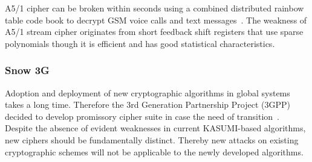 A5/1 cipher can be broken within seconds using a combined distributed
rainbow table code book to decrypt GSM voice calls and text
messages~\cite{secproject}. 
The weakness of A5/1 stream
cipher originates from short feedback shift registers that use sparse
polynomials though it is efficient and has good statistical characteristics.

\subsubsection{Snow 3G}

Adoption and deployment of new cryptographic algorithms in global systems takes
a long time. Therefore the 3rd Generation Partnership Project (3GPP) decided to
develop promissory cipher suite in case the need of
transition~\cite{3gpp:uea2_doc1}. Despite the absence of evident weaknesses in
current KASUMI-based algorithms, new ciphers should be fundamentally distinct.
Thereby new attacks on existing cryptographic schemes will not be applicable to
the newly developed algorithms.

